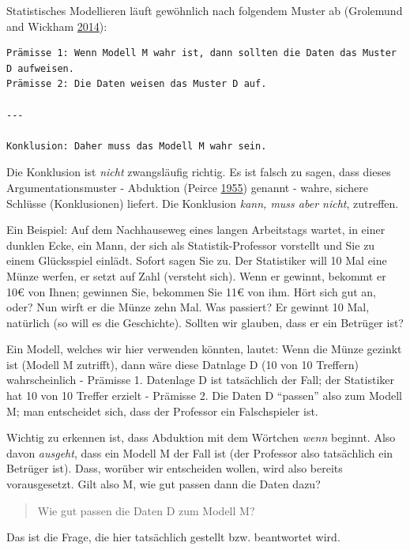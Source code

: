 \documentclass[12pt,]{book}
\newcommand{\euro}{€}
\begin{document}
Statistisches Modellieren läuft gewöhnlich nach folgendem Muster ab
(Grolemund and Wickham
\protect\hyperlink{ref-grolemund2014cognitive}{2014}):

\begin{verbatim}
Prämisse 1: Wenn Modell M wahr ist, dann sollten die Daten das Muster D aufweisen.
Prämisse 2: Die Daten weisen das Muster D auf.

---

Konklusion: Daher muss das Modell M wahr sein.
\end{verbatim}

Die Konklusion ist \emph{nicht} zwangsläufig richtig. Es ist falsch zu
sagen, dass dieses Argumentationsmuster - Abduktion (Peirce
\protect\hyperlink{ref-peirce1955abduction}{1955}) genannt - wahre,
sichere Schlüsse (Konklusionen) liefert. Die Konklusion \emph{kann, muss
aber nicht}, zutreffen.

Ein Beispiel: Auf dem Nachhauseweg eines langen Arbeitstags wartet, in
einer dunklen Ecke, ein Mann, der sich als Statistik-Professor vorstellt
und Sie zu einem Glücksspiel einlädt. Sofort sagen Sie zu. Der
Statistiker will 10 Mal eine Münze werfen, er setzt auf Zahl (versteht
sich). Wenn er gewinnt, bekommt er 10\euro{} von Ihnen; gewinnen Sie,
bekommen Sie 11\euro{} von ihm. Hört sich gut an, oder? Nun wirft er die
Münze zehn Mal. Was passiert? Er gewinnt 10 Mal, natürlich (so will es
die Geschichte). Sollten wir glauben, dass er ein Betrüger ist?

Ein Modell, welches wir hier verwenden könnten, lautet: Wenn die Münze
gezinkt ist (Modell M zutrifft), dann wäre diese Datnlage D (10 von 10
Treffern) wahrscheinlich - Prämisse 1. Datenlage D ist tatsächlich der
Fall; der Statistiker hat 10 von 10 Treffer erzielt - Prämisse 2. Die
Daten D ``passen'' also zum Modell M; man entscheidet sich, dass der
Professor ein Falschspieler ist.

Wichtig zu erkennen ist, dass Abduktion mit dem Wörtchen \emph{wenn}
beginnt. Also davon \emph{ausgeht}, dass ein Modell M der Fall ist (der
Professor also tatsächlich ein Betrüger ist). Dass, worüber wir
entscheiden wollen, wird also bereits vorausgesetzt. Gilt also M, wie
gut passen dann die Daten dazu?

\begin{quote}
Wie gut passen die Daten D zum Modell M?
\end{quote}

Das ist die Frage, die hier tatsächlich gestellt bzw. beantwortet wird.
\end{document}
